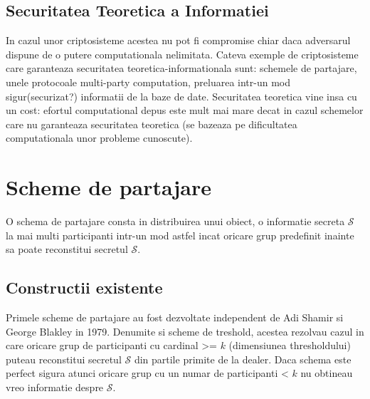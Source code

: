 \documentclass{llncs}
\begin{document}

\subsection{Securitatea Teoretica a Informatiei}

In cazul unor criptosisteme acestea nu pot fi compromise chiar daca adversarul dispune de o putere computationala nelimitata. Cateva exemple de criptosisteme care garanteaza securitatea teoretica-informationala sunt: schemele de partajare, unele protocoale multi-party computation, preluarea intr-un mod sigur(securizat?) informatii de la baze de date. Securitatea teoretica vine insa cu un cost: efortul computational depus este mult mai mare decat in cazul schemelor care nu garanteaza securitatea teoretica (se bazeaza pe dificultatea computationala unor probleme cunoscute). \cite{L:1997}

\section{Scheme de partajare}
\label{sec:encryption}

O schema de partajare consta in distribuirea unui obiect, o informatie secreta $\mathcal{S}$ la mai multi participanti intr-un mod astfel incat oricare grup predefinit inainte sa poate reconstitui secretul $\mathcal{S}$.


\subsection{Constructii existente}
Primele scheme de partajare au fost dezvoltate independent de Adi Shamir si George Blakley in 1979. \cite{B:1979, S:1979}
Denumite si scheme de treshold, acestea rezolvau cazul in care oricare grup de participanti cu cardinal  >= $k$  (dimensiunea thresholdului) puteau reconstitui secretul $\mathcal{S}$ din partile primite de la dealer. Daca schema este perfect sigura atunci oricare grup cu un numar de participanti < $k$ nu obtineau vreo informatie despre $\mathcal{S}$.
\end{document}

